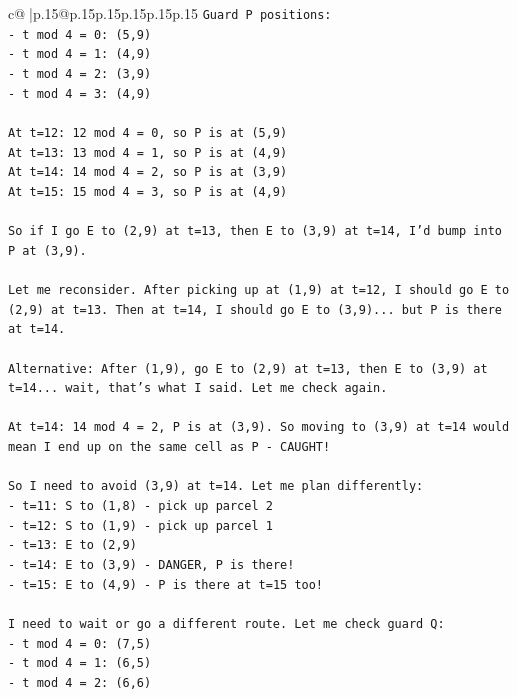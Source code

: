 \documentclass{article}
\begin{document}
{\begin{supertabular}{c@{$\;$}|p{.15\linewidth}@{}p{.15\linewidth}p{.15\linewidth}p{.15\linewidth}p{.15\linewidth}p{.15\linewidth}}
{{{\texttt{Guard P positions:} \\
\texttt{{-} t mod 4 = 0: (5,9)} \\
\texttt{{-} t mod 4 = 1: (4,9)} \\
\texttt{{-} t mod 4 = 2: (3,9)} \\
\texttt{{-} t mod 4 = 3: (4,9)} \\
\\ 
\texttt{At t=12: 12 mod 4 = 0, so P is at (5,9)} \\
\texttt{At t=13: 13 mod 4 = 1, so P is at (4,9)} \\
\texttt{At t=14: 14 mod 4 = 2, so P is at (3,9)} \\
\texttt{At t=15: 15 mod 4 = 3, so P is at (4,9)} \\
\\ 
\texttt{So if I go E to (2,9) at t=13, then E to (3,9) at t=14, I'd bump into P at (3,9).} \\
\\ 
\texttt{Let me reconsider. After picking up at (1,9) at t=12, I should go E to (2,9) at t=13. Then at t=14, I should go E to (3,9)... but P is there at t=14.} \\
\\ 
\texttt{Alternative: After (1,9), go E to (2,9) at t=13, then E to (3,9) at t=14... wait, that's what I said. Let me check again.} \\
\\ 
\texttt{At t=14: 14 mod 4 = 2, P is at (3,9). So moving to (3,9) at t=14 would mean I end up on the same cell as P {-} CAUGHT!} \\
\\ 
\texttt{So I need to avoid (3,9) at t=14. Let me plan differently:} \\
\texttt{{-} t=11: S to (1,8) {-} pick up parcel 2} \\
\texttt{{-} t=12: S to (1,9) {-} pick up parcel 1} \\
\texttt{{-} t=13: E to (2,9)} \\
\texttt{{-} t=14: E to (3,9) {-} DANGER, P is there!} \\
\texttt{{-} t=15: E to (4,9) {-} P is there at t=15 too!} \\
\\ 
\texttt{I need to wait or go a different route. Let me check guard Q:} \\
\texttt{{-} t mod 4 = 0: (7,5)} \\
\texttt{{-} t mod 4 = 1: (6,5)} \\
\texttt{{-} t mod 4 = 2: (6,6)} \\
}}}
\end{supertabular}}
\end{document}
